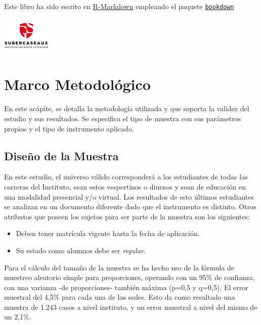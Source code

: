 \documentclass[]{book}
\providecommand{\tightlist}{%
  \setlength{\itemsep}{0pt}\setlength{\parskip}{0pt}}
\begin{document}
Este libro ha sido escrito en
\href{http://rmarkdown.rstudio.com}{R-Markdown} empleando el paquete
\href{https://bookdown.org/yihui/bookdown/}{\texttt{bookdown}}

\begin{flushleft}\includegraphics{images/IconoIGS} \end{flushleft}

\chapter{Marco Metodológico}\label{intro}

En este acápite, se detalla la metodología utilizada y que soporta la
validez del estudio y sus resultados. Se especifica el tipo de muestra
con sus parámetros propios y el tipo de instrumento aplicado.

\section{Diseño de la Muestra}\label{requisitos}

En este estudio, el universo válido corresponderá a los estudiantes de
todas las carreras del Instituto, sean estos vespertinos o diurnos y
sean de educación en una modalidad presencial y/o virtual. Los
resultados de esto últimos estudiantes se analizan en un documento
diferente dado que el instrumento es distinto. Otros atributos que
poseen los sujetos para ser parte de la muestra son los siguientes:

\begin{itemize}
\tightlist
\item
  Deben tener matrícula vigente hasta la fecha de aplicación.
\item
  Su estado como alumnos debe ser \emph{regular}.
\end{itemize}

Para el cálculo del tamaño de la muestra se ha hecho uso de la fórmula
de muestreo aleatorio simple para proporciones, operando con un 95\% de
confianza, con una varianza -de proporciones- también máxima (p=0,5 y
q=0,5). El error muestral del 4,5\% para cada una de las sedes. Esto da
como resultado una muestra de 1.243 casos a nivel instituto, y un error
muestral a nivel del mismo de un 2,1\%.
\end{document}
